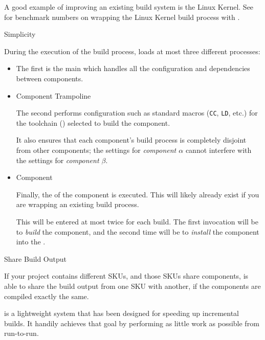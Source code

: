 \begin{description}
  A good example of improving an existing build system is the Linux
  Kernel.  See~ for benchmark numbers on
  wrapping the Linux Kernel build process with \lmsbw.

\item \makefile Simplicity

  During the execution of the build process, \lmsbw loads at most
  three different \makefile processes:

  \begin{itemize}
  \item \lmsbw \makefile

    The first is the main \lmsbw \makefile which handles all the
    configuration and dependencies between components.

  \item Component Trampoline \makefile

    The second \makefile performs configuration such as standard
    \makefile macros (\texttt{CC}, \texttt{LD}, etc.) for the
    toolchain () selected to build the
    component.

    It also ensures that each component's build process is completely
    disjoint from other components; the settings for \emph{component
      $\alpha$} cannot interfere with the settings for \emph{component
      $\beta$}.

  \item Component \makefile

    Finally, the \makefile of the component is executed.  This will
    likely already exist if you are wrapping an existing build process.

    This \makefile will be entered at most twice for each build.  The
    first invocation will be to \emph{build} the component, and the
    second time will be to \emph{install} the component into the
    \destdir.
\end{itemize}

\item Share Build Output

  If your project contains different SKUs, and those SKUs share
  components, \lmsbw is able to share the build output from one SKU
  with another, if the components are compiled exactly the same.

\end{description}

\lmsbw is a lightweight system that has been designed for speeding up
incremental builds.  It handily achieves that goal by performing as
little work as possible from run-to-run.


